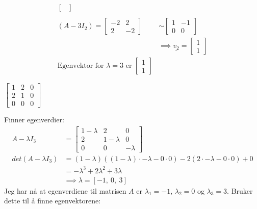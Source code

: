 \documentclass[11pt, a4paper, norsk]{NTNUoving}
\begin{document}
\begin{oppgave}
\begin{punkt}
\begin{align*}
\begin{bmatrix}
                \end{bmatrix}
                \\
                \\
                (A - 3I_2) = \begin{bmatrix}
                    -2 & 2 \\
                    2 & -2
                \end{bmatrix} &\sim \begin{bmatrix}
                1 & -1 \\
                0 & 0
                \end{bmatrix}
                \\
                &\implies \underline{v_2} = \begin{bmatrix}
                    1 \\
                    1
                \end{bmatrix}
                \\
                 \text{Egenvektor for } \lambda = 3 \text{ er } \begin{bmatrix}
                    1 \\
                    1
                \end{bmatrix}
            \end{align*}
        \end{punkt}
        \begin{punkt}
            $\begin{bmatrix}
                1 & 2 & 0 \\
                2 & 1 & 0 \\
                0 & 0 & 0
            \end{bmatrix}$

            Finner egenverdier:
            \begin{align*}
                A - \lambda I_{3} &= \begin{bmatrix}
                    1 - \lambda & 2 & 0 \\
                    2 & 1 - \lambda & 0 \\
                    0 & 0 & -\lambda
                \end{bmatrix}
                \\
                    det(A - \lambda I_{3}) &= (1-\lambda)((1-\lambda) \cdot -\lambda- 0 \cdot 0) - 2(2 \cdot -\lambda - 0 \cdot 0) + 0 \\
                                          &= -\lambda^3 + 2\lambda^2 + 3\lambda
                                          \\
                                          &\implies \lambda = \left[ -1, \  0, \  3\right]
            \end{align*}
            Jeg har nå at egenverdiene til matrisen $A$ er $\lambda_1 = -1$, $\lambda_2 = 0$ og $\lambda_3 = 3$. Bruker dette til å finne egenvektorene:
            

\end{punkt}
\end{oppgave}
\end{document}
